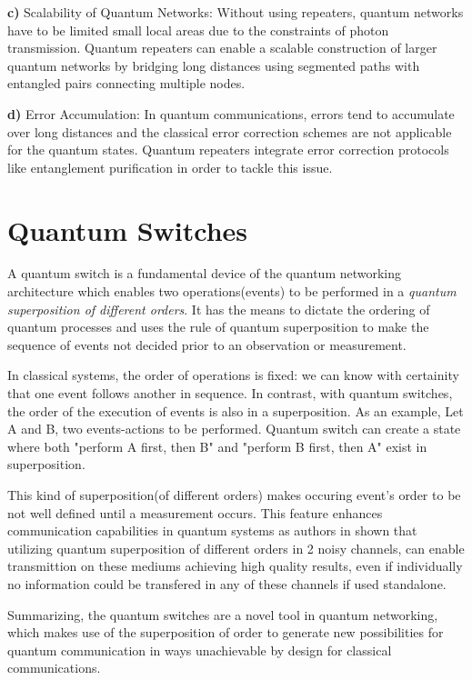 \documentclass[12pt,a4paper] {report}
\begin{document}
		\textbf{c)} Scalability of Quantum Networks:
		Without using repeaters, quantum networks have to be limited small local areas due to the
		constraints of photon transmission.
		Quantum repeaters can enable a scalable construction 
		of larger quantum networks by bridging long distances using segmented 
		paths with entangled pairs connecting multiple nodes.
		
		\textbf{d)} Error Accumulation:
		In quantum communications, errors tend to accumulate over long distances
		and the classical error correction schemes are not applicable for the quantum states.
		Quantum repeaters integrate error correction protocols like entanglement purification
		in order to tackle this issue.

		\section{Quantum Switches}
		
		A quantum switch is a fundamental device of the quantum networking 
		architecture which
		enables two operations(events) to be performed in a \textit{quantum superposition of different orders}. 
		It has the means to dictate the ordering of quantum processes and
		uses the rule of quantum superposition to make the sequence of events not decided 
		prior to an observation or measurement.

		In classical systems, the order of operations is fixed: we can know with certainity that one event follows another in sequence. 
		In contrast, with quantum switches, the order of the execution of events is also in a superposition.
		As an example,
		Let A and B, two events-actions to be performed. Quantum switch can create a state where both "perform A first, then B"
		and "perform B first, then A" exist in superposition.

		This kind of superposition(of different orders) makes occuring event's order to be not well defined until
		a measurement occurs. This feature enhances communication capabilities in quantum systems as authors in \cite{superposition-orders-proof}
		shown that utilizing quantum superposition of different orders in 2 noisy channels, 
		can enable transmittion on these mediums achieving high quality results,
		even if individually no information could be transfered in any of these channels if used standalone. 

		Summarizing, the quantum switches are a novel tool in quantum networking, 
		which makes use of the superposition of order to generate new possibilities for 
		quantum communication in ways unachievable by design for classical communications. 
\end{document}
